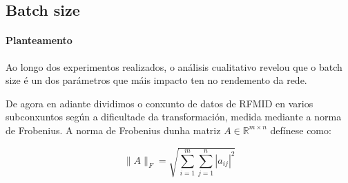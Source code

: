 







\subsection{Batch size}
\label{subsec:Batch size}

\paragraph{Planteamento}
\label{par:Planteamento-batchsize}

Ao longo dos experimentos realizados, o análisis cualitativo revelou que o batch size é un dos parámetros que máis impacto ten no rendemento da rede.

De agora en adiante dividimos o conxunto de datos de RFMID en varios subconxuntos según a dificultade da transformación, medida mediante a norma de Frobenius.
A norma de Frobenius dunha matriz $A \in \mathbb{R}^{m \times n}$ defínese como:

\[
\|A\|_F = \sqrt{\sum_{i=1}^{m} \sum_{j=1}^{n} |a_{ij}|^2}
\]

